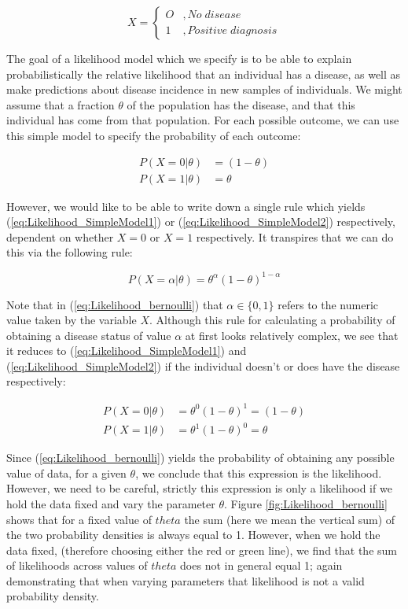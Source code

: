 \documentclass[11pt,fullpage]{book}
\begin{document}
\begin{equation}
X =
\begin{cases}
O & , No\; disease \\
1 & , Positive \; diagnosis
\end{cases}
\end{equation}

The goal of a likelihood model which we specify is to be able to explain probabilistically the relative likelihood that an individual has a disease, as well as make predictions about disease incidence in new samples of individuals. We might assume that a fraction $\theta$ of the population has the disease, and that this individual has come from that population. For each possible outcome, we can use this simple model to specify the probability of each outcome:

\begin{align}\label{eq:Likelihood_SimpleModel1}
P(X = 0|\theta)& = (1-\theta)\\
P(X = 1|\theta)& = \theta\label{eq:Likelihood_SimpleModel2}
\end{align}

However, we would like to be able to write down a single rule which yields (\ref{eq:Likelihood_SimpleModel1}) or (\ref{eq:Likelihood_SimpleModel2}) respectively, dependent on whether $X=0$ or $X=1$ respectively. It transpires that we can do this via the following rule:

\begin{equation}
P(X=\alpha|\theta) = \theta^\alpha(1-\theta)^{1-\alpha}
\end{equation}\label{eq:Likelihood_bernoulli}

Note that in (\ref{eq:Likelihood_bernoulli}) that $\alpha\in\{0,1\}$ refers to the numeric value taken by the variable $X$. Although this rule for calculating a probability of obtaining a disease status of value $\alpha$ at first looks relatively complex, we see that it reduces to (\ref{eq:Likelihood_SimpleModel1}) and (\ref{eq:Likelihood_SimpleModel2}) if the individual doesn't or does have the disease respectively:

\begin{align}\label{eq:Likelihood_SimpleModel3}
P(X = 0|\theta)& = \theta^0(1-\theta)^1 = (1-\theta)\\
P(X = 1|\theta)& = \theta^1(1-\theta)^0 = \theta\label{eq:Likelihood_SimpleModel4}
\end{align}

Since (\ref{eq:Likelihood_bernoulli}) yields the probability of obtaining any possible value of data, for a given $\theta$, we conclude that this expression is the likelihood. However, we need to be careful, strictly this expression is only a likelihood if we hold the data fixed and vary the parameter $\theta$. Figure \ref{fig:Likelihood_bernoulli} shows that for a fixed value of $theta$ the sum (here we mean the vertical sum) of the two probability densities is always equal to 1. However, when we hold the data fixed, (therefore choosing either the red or green line), we find that the sum of likelihoods across values of $theta$ does not in general equal 1; again demonstrating that when varying parameters that likelihood is not a valid probability density.
\end{document}

